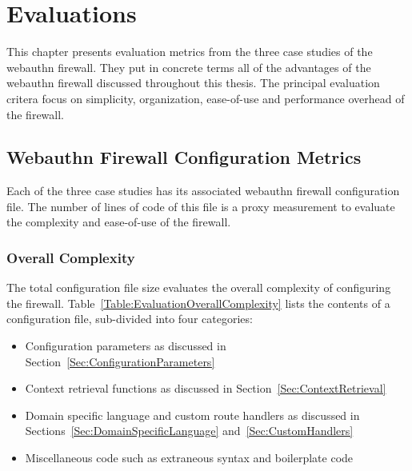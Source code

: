 
\chapter{Evaluations}\label{Chap:Evaluations}

This chapter presents evaluation metrics from the three case studies of the webauthn firewall. They put in concrete terms all of the advantages of the webauthn firewall discussed throughout this thesis. The principal evaluation critera focus on simplicity, organization, ease-of-use and performance overhead of the firewall.

\section{Webauthn Firewall Configuration Metrics}

Each of the three case studies has its associated webauthn firewall configuration file. The number of lines of code of this file is a proxy measurement to evaluate the complexity and ease-of-use of the firewall. 

\subsection{Overall Complexity}

The total configuration file size evaluates the overall complexity of configuring the firewall. Table~\ref{Table:EvaluationOverallComplexity} lists the contents of a configuration file, sub-divided into four categories:

\begin{itemize}[nosep]

\item Configuration parameters as discussed in Section~\ref{Sec:ConfigurationParameters}

\item Context retrieval functions as discussed in Section~\ref{Sec:ContextRetrieval}

\item Domain specific language and custom route handlers as discussed in Sections~\ref{Sec:DomainSpecificLanguage} and~\ref{Sec:CustomHandlers}

\item Miscellaneous code such as extraneous syntax and boilerplate code

\end{itemize}

